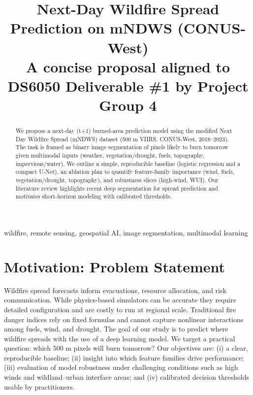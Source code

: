 \documentclass[conference]{IEEEtran}
\begin{document}
\title{Next-Day Wildfire Spread Prediction on mNDWS (CONUS-West)\\
{\footnotesize A concise proposal aligned to DS6050 Deliverable \#1 by Project Group 4}
}

\author{
}


\maketitle

\begin{abstract}
We propose a next-day (t+1) burned-area prediction model using the modified Next Day Wildfire Spread (mNDWS) dataset (500 m VIIRS, CONUS-West, 2018--2023). The task is framed as binary image segmentation of pixels likely to burn tomorrow given multimodal inputs (weather, vegetation/drought, fuels, topography, impervious/water). We outline a simple, reproducible baseline (logistic regression and a compact U-Net), an ablation plan to quantify feature-family importance (wind, fuels, vegetation/drought, topography), and robustness slices (high-wind, WUI). Our literature review highlights recent deep segmentation for spread prediction and motivates short-horizon modeling with calibrated thresholds.
\end{abstract}

\begin{IEEEkeywords}
wildfire, remote sensing, geospatial AI, image segmentation, multimodal learning
\end{IEEEkeywords}

\section{Motivation: Problem Statement}
Wildfire spread forecasts inform evacuations, resource allocation, and risk communication. While physics-based simulators can be accurate they require detailed configuration and are costly to run at regional scale. Traditional fire danger indices rely on fixed formulas and cannot capture nonlinear interactions among fuels, wind, and drought. The goal of our study is to predict where wildfire spreads with the use of a deep learning model. We target a practical question: which 500 m pixels will burn tomorrow? Our objectives are: (i) a clear, reproducible baseline; (ii) insight into which feature families drive performance; (iii) evaluation of model robustness under challenging conditions such as high winds and wildland–urban interface areas; and (iv) calibrated decision thresholds usable by practitioners.
\end{document}
